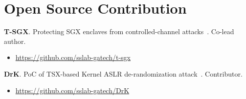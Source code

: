 \section*{Open Source Contribution}

\begin{description}

\item
\textbf{T-SGX}. Protecting SGX enclaves from controlled-channel attacks~. Co-lead author.
\vspace{-0.12cm}
\begin{itemize}
\item \url{https://github.com/sslab-gatech/t-sgx}
\end{itemize}  

\item
\textbf{DrK}. PoC of TSX-based Kernel ASLR de-randomization attack~. Contributor.
\vspace{-0.12cm}
\begin{itemize}
\item \url{https://github.com/sslab-gatech/DrK}
\end{itemize}  

\end{description}
